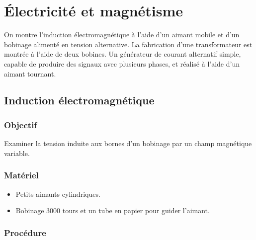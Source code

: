 \documentclass{book}
\begin{document}




\chapter{Électricité et magnétisme}


On montre l'induction électromagnétique à l'aide d'un aimant mobile et d'un bobinage alimenté en tension alternative. La fabrication d'une transformateur est montrée à l'aide de deux bobines. Un générateur de courant alternatif simple, capable de produire des signaux avec plusieurs phases, et réalisé à l'aide d'un aimant tournant.







\section{Induction électromagnétique}



\subsection{Objectif}


Examiner la tension induite aux bornes d'un bobinage par un champ magnétique variable.




\subsection{Matériel}


\begin{itemize}
  \item Petits aimants cylindriques.
  \item Bobinage 3000 tours et un tube en papier pour guider l'aimant.
\end{itemize}

\subsection{Procédure}
\end{document}
